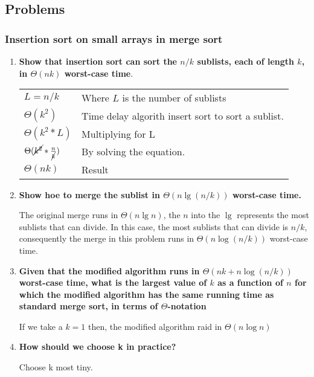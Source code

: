 \documentclass[a4paper,12pt]{article}
\begin{document}
  \subsection{Problems}
    \subsubsection{Insertion sort on small arrays in merge sort}
    \begin{enumerate}
      \item \textbf{ Show that insertion sort can sort the $n/k$ sublists, each
      of length $k$, in $\Theta(nk)$ worst-case time}. \\
           
      \begin{tabular}{l l}
       $L = n/k$ & Where $L$ is the number of sublists \\ 
       $\Theta(k^2)$ & Time delay algorith insert sort to sort a sublist. \\
       $\Theta(k^2 * L)$ & Multiplying for L \\
       $\Theta(\cancel{k^2} * \frac{n}{\cancel{k}})$ & By solving the equation.\\
       $\Theta(nk)$ & Result
      \end{tabular}
      
      \item \textbf{Show hoe to merge the sublist in $\Theta(n \lg(n/k))$
      worst-case time.}
      
      The original merge runs in $\Theta(n \lg n)$, the $n$ into the $\lg$
      represents the most sublists that can divide. In this case, the most sublists that can 
      divide is $n/k$, consequently the merge in this problem runs in
      $\Theta(n\log(n/k))$ worst-case time.
      
     \item \textbf{Given that the modified algorithm runs in $\Theta(nk+n\log(n/k))$
     worst-case time, what is the largest value of $k$ as a function of $n$
      for which the modified algorithm has the same running time as standard merge sort, in terms of
      $\Theta$-notation} 
      
     If we take a $k = 1$ then, the modified algorithm raid in 
     $\Theta(n\log n)$
      
      \item \textbf{How should we choose k in practice?}
      
     Choose k most tiny.
      
    \end{enumerate}
    
\end{document}
